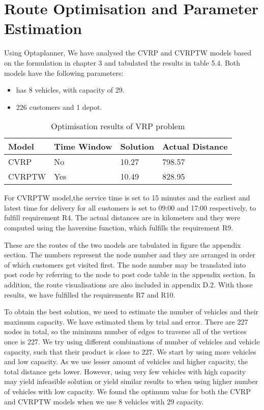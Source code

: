 \section{Route Optimisation and Parameter Estimation}
Using Optaplanner, We have analysed the CVRP and CVRPTW models based on the formulation in chapter 3 and tabulated the results in
table 5.4. Both models have the following parameters:
\begin{itemize}
\item has 8 vehicles, with capacity of 29.
\item 226 customers and 1 depot.
\end{itemize}
\begin{table}[!ht]
\centering
\begin{tabular}{|l|l|l|l|}
\hline
Model  & Time Window & Solution & Actual Distance \\ \hline
CVRP   & No          & 10.27   & 798.57\\ \hline
CVRPTW & Yes         & 10.49   & 828.95\\ \hline
\end{tabular}
\caption{Optimisation results of VRP problem}
\label{my-label}
\end{table}

For CVRPTW model,the service time is set to 15 minutes and the earliest and latest time for delivery for all customers is set to 09:00 and 17:00 respectively, to fulfill
requirement R4. The actual distances are in kilometers and they were computed using the haversine function, which fulfills the requirement R9.

These are the routes of the two models are tabulated in figure the appendix section. The numbers represent the node number and
they are arranged in order of which customers get visited first. The node number may be translated into post code by referring
to the node to post code table in the appendix section. In addition, the route visualisations are also included in appendix D.2.
With those results, we have fulfilled the requirements R7 and R10.

To obtain the best solution, we need to estimate the number of vehicles and their maximum capacity.
We have estimated them by trial and error. There are 227 nodes in total, so the minimum number of edges to traverse
 all of the vertices once is 227. We try using different combinations of number of vehicles and vehicle capacity, such that their product
 is close to 227. We start by using more vehicles and low capacity. As we use lesser amount of vehicles and higher
  capacity, the total distance gets lower. However, using very few vehicles with high capacity may
yield infeasible solution or yield similar results to when using higher number of vehicles with low capacity.
We found the optimum value for both the CVRP and CVRPTW models when we use 8 vehicles with 29 capacity.

